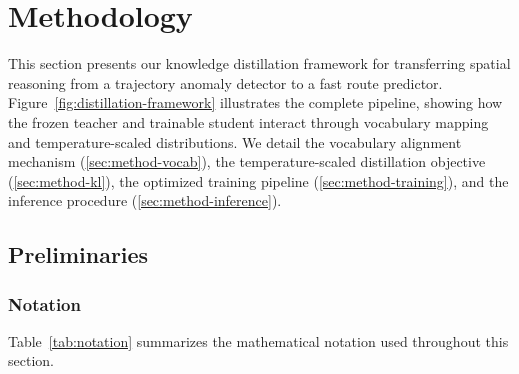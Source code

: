 \section{Methodology}
\label{sec:methodology}

This section presents our knowledge distillation framework for transferring spatial reasoning from a trajectory anomaly detector to a fast route predictor. Figure~\ref{fig:distillation-framework} illustrates the complete pipeline, showing how the frozen teacher and trainable student interact through vocabulary mapping and temperature-scaled distributions. We detail the vocabulary alignment mechanism (\autoref{sec:method-vocab}), the temperature-scaled distillation objective (\autoref{sec:method-kl}), the optimized training pipeline (\autoref{sec:method-training}), and the inference procedure (\autoref{sec:method-inference}).

\subsection{Preliminaries}
\label{sec:method-prelim}

\subsubsection{Notation}
Table~\ref{tab:notation} summarizes the mathematical notation used throughout this section.

